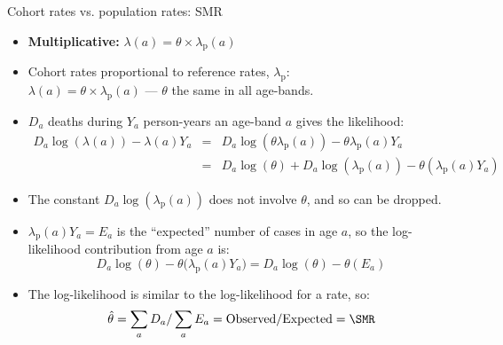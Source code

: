 \begin{frame}{Cohort rates vs. population rates: SMR}
  \begin{itemize}
  \item \textbf{Multiplicative:} $\lambda(a) = \theta \times \lambda_\text{p}(a)$
  \item Cohort rates proportional to reference rates, $\lambda_\text{p}$:\\
    $\lambda(a) = \theta \times \lambda_\text{p}(a)$ --- $\theta$ the same in all
    age-bands.
  \item $D_a$ deaths during $Y_a$ person-years an age-band $a$ gives
    the likelihood:
 \begin{eqnarray*}
    D_a \log(\lambda(a)) - \lambda(a) Y_a
  & = & D_a \log(\theta\lambda_\text{p}(a)) - \theta\lambda_\text{p}(a) Y_a \\
  & = & D_a \log(\theta)+ D_a \log(\lambda_\text{p}(a)) %
        - \theta(\lambda_\text{p}(a) Y_a)
\end{eqnarray*}
\item The constant $D_a \log(\lambda_\text{p}(a))$ does not involve $\theta$,
  and so can be dropped.
\end{itemize}
\end{frame}

\begin{frame}
  \begin{itemize}
  \item $\lambda_\text{p}(a)Y_a = E_a$ is the ``expected'' number of cases in
    age $a$, so the log-likelihood contribution from age $a$ is:
\[
 D_a \log(\theta) - \theta\big(\lambda_\text{p}(a) Y_a\big) =
 D_a \log(\theta) - \theta(E_a)
\]
\item The log-likelihood is similar to the log-likelihood for a rate, so:
\[
  \hat\theta = \sum_aD_a / \sum_aE_a =
  \mbox{Observed}/\mbox{Expected}
  = \SMR
\]
\end{itemize}
\end{frame}

